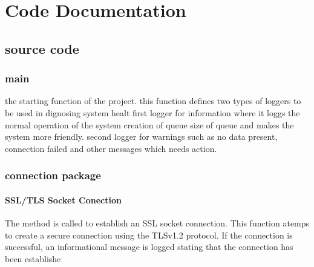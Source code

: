 \documentclass[letterpaper,10pt,english]{sphinxmanual}
\begin{document}
\sphinxstepscope


\chapter{Code Documentation}
\label{\detokenize{codedoc:code-documentation}}\label{\detokenize{codedoc::doc}}

\section{source code}
\label{\detokenize{codedoc:source-code}}
\sphinxstepscope


\subsection{main}
\label{\detokenize{main:module-main}}\label{\detokenize{main:main}}\label{\detokenize{main::doc}}

\begin{fulllineitems}
\label{\detokenize{main:main.main}}
\pysigstartsignatures
{}
\pysigstopsignatures
\sphinxAtStartPar
the starting function of the project.
this function defines two types of loggers to be used in dignosing system healt 
first logger for information where it loggs the normal operation of the system creation of queue size of queue
and makes the system more friendly.
second logger for warnings such as no data present, connection failed and other messages which needs action.

\end{fulllineitems}


\sphinxstepscope


\subsection{connection package}
\label{\detokenize{connection:connection-package}}\label{\detokenize{connection::doc}}

\subsubsection{SSL/TLS Socket Conection}
\label{\detokenize{connection:ssl-tls-socket-conection}}
\sphinxAtStartPar
The method  is called to establish an SSL socket connection.
This function atemps to create a secure connection using the TLSv1.2 protocol.
If the connection is successful, an informational message is logged stating that the connection has been establishe
\end{document}
